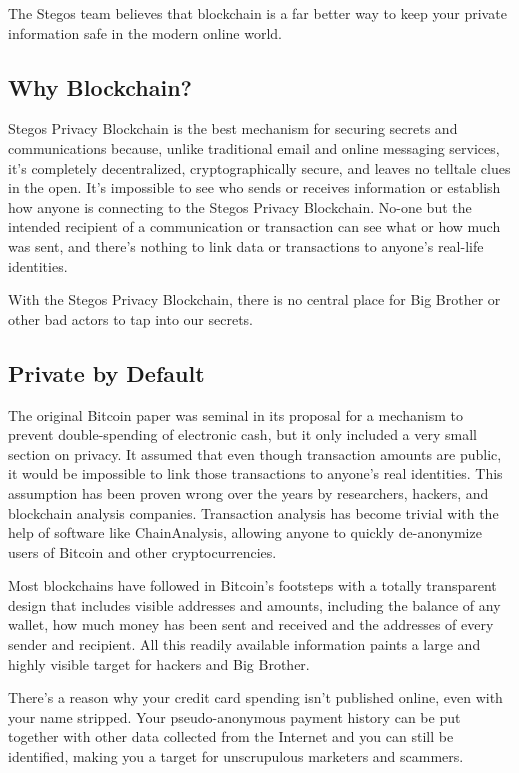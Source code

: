 \documentclass[a4paper, 10pt, conference]{ieeeconf}
\begin{document}
The Stegos team believes that blockchain is a far better way to keep your private information safe in the modern online world.

\subsection{Why Blockchain?}
Stegos Privacy Blockchain is the best mechanism for securing secrets and communications because, unlike traditional email and online messaging services, it’s completely decentralized, cryptographically secure, and leaves no telltale clues in the open. It’s impossible to see who sends or receives information or establish how anyone is connecting to the Stegos Privacy Blockchain. No-one but the intended recipient of a communication or transaction can see what or how much was sent, and there’s nothing to link data or transactions to anyone’s real-life identities.

With the Stegos Privacy Blockchain, there is no central place for Big Brother or other bad actors to tap into our secrets.

\subsection{Private by Default}
The original Bitcoin paper was seminal in its proposal for a mechanism to prevent double-spending of electronic cash, but it only included a very small section on privacy. It assumed that even though transaction amounts are public, it would be impossible to link those transactions to anyone’s real identities. This assumption has been proven wrong over the years by researchers, hackers, and blockchain analysis companies. Transaction analysis has become trivial with the help of software like ChainAnalysis, allowing anyone to quickly de-anonymize users of Bitcoin and other cryptocurrencies.

Most blockchains have followed in Bitcoin’s footsteps with a totally transparent design that includes visible addresses and amounts, including the balance of any wallet, how much money has been sent and received and the addresses of every sender and recipient. All this readily available information paints a large and highly visible target for hackers and Big Brother.

There’s a reason why your credit card spending isn’t published online, even with your name stripped. Your pseudo-anonymous payment history can be put together with other data collected from the Internet and you can still be identified, making you a target for unscrupulous marketers and scammers.
\end{document}
